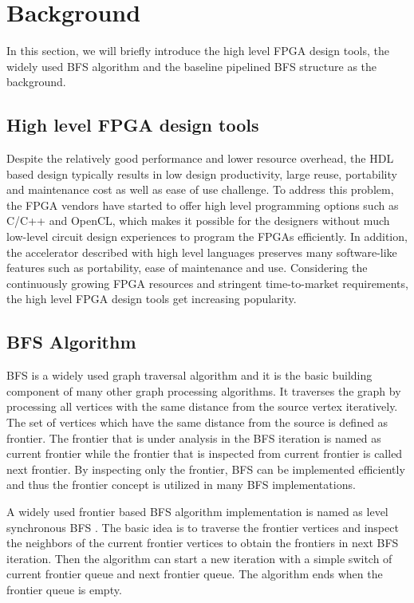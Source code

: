 \section{Background} \label{sec:background}
In this section, we will briefly introduce the high level FPGA design tools,
the widely used BFS algorithm and the baseline pipelined BFS structure 
as the background.

\subsection{High level FPGA design tools}
Despite the relatively good performance and lower resource overhead, 
the HDL based design typically results in low design productivity, large reuse, 
portability and maintenance cost as well as ease of use challenge. 
To address this problem, the FPGA vendors have started 
to offer high level programming options such as C/C++ and OpenCL, which makes 
it possible for the designers without much low-level circuit design 
experiences \cite{nimbix, xilinx-sdaccel, intel-opencl} 
to program the FPGAs efficiently. In addition, the accelerator 
described with high level languages preserves many software-like features 
such as portability, ease of maintenance and use. Considering the  
continuously growing FPGA resources and stringent time-to-market requirements, 
the high level FPGA design tools \cite{Nane2016hls-survey} get increasing popularity.

\subsection{BFS Algorithm}
BFS is a widely used graph traversal algorithm and it is the basic 
building component of many other graph processing algorithms. 
It traverses the graph by processing all vertices with the same distance from the 
source vertex iteratively. The set of vertices which have the same distance from the 
source is defined as frontier. The frontier that is under analysis in the BFS iteration 
is named as current frontier while the frontier that is inspected from current frontier 
is called next frontier. By inspecting only the frontier, BFS can be implemented efficiently 
and thus the frontier concept is utilized in many BFS implementations.

A widely used frontier based BFS algorithm implementation is named as 
level synchronous BFS \cite{attia2014cygraph, betkaoui2012reconfigurable, 
zhang2017boosting}. The basic idea is to traverse the frontier vertices 
and inspect the neighbors of the current frontier vertices to obtain the 
frontiers in next BFS iteration. Then the algorithm can start a new 
iteration with a simple switch of current frontier queue and next frontier queue. 
The algorithm ends when the frontier queue is empty.

